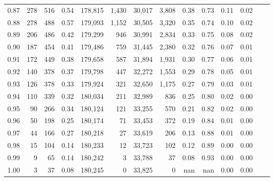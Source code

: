 \begin{tabular}{rrrrrrrrrrrrrr}
0.87 &    278 &  516 &    0.54 &  178,815 &    1,430 &  30,017 &   3,808 &  0.38 &  0.73 &  0.11 &      0.02 \\
0.88 &    278 &  488 &    0.57 &  179,093 &    1,152 &  30,505 &   3,320 &  0.35 &  0.74 &  0.10 &      0.02 \\
0.89 &    206 &  486 &    0.42 &  179,299 &      946 &  30,991 &   2,834 &  0.33 &  0.75 &  0.08 &      0.02 \\
0.90 &    187 &  454 &    0.41 &  179,486 &      759 &  31,445 &   2,380 &  0.32 &  0.76 &  0.07 &      0.01 \\
0.91 &    172 &  449 &    0.38 &  179,658 &      587 &  31,894 &   1,931 &  0.30 &  0.77 &  0.06 &      0.01 \\
0.92 &    140 &  378 &    0.37 &  179,798 &      447 &  32,272 &   1,553 &  0.29 &  0.78 &  0.05 &      0.01 \\
0.93 &    126 &  378 &    0.33 &  179,924 &      321 &  32,650 &   1,175 &  0.27 &  0.79 &  0.03 &      0.01 \\
0.94 &    110 &  339 &    0.32 &  180,034 &      211 &  32,989 &     836 &  0.25 &  0.80 &  0.02 &      0.00 \\
0.95 &     90 &  266 &    0.34 &  180,124 &      121 &  33,255 &     570 &  0.21 &  0.82 &  0.02 &      0.00 \\
0.96 &     50 &  198 &    0.25 &  180,174 &       71 &  33,453 &     372 &  0.19 &  0.84 &  0.01 &      0.00 \\
0.97 &     44 &  166 &    0.27 &  180,218 &       27 &  33,619 &     206 &  0.13 &  0.88 &  0.01 &      0.00 \\
0.98 &     15 &  104 &    0.14 &  180,233 &       12 &  33,723 &     102 &  0.12 &  0.89 &  0.00 &      0.00 \\
0.99 &      9 &   65 &    0.14 &  180,242 &        3 &  33,788 &      37 &  0.08 &  0.93 &  0.00 &      0.00 \\
1.00 &      3 &   37 &    0.08 &  180,245 &        0 &  33,825 &       0 &   nan &   nan &  0.00 &      0.00 \\
\bottomrule
\end{tabular}
